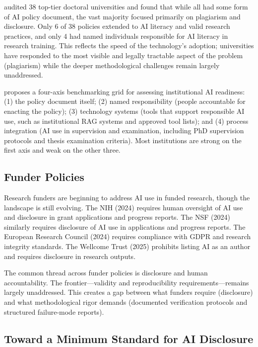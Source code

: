 \documentclass[12pt, a4paper]{article}
\begin{document}
\citet{zyphur2026responsible} audited 38 top-tier doctoral universities and found that while all had some form of AI policy document, the vast majority focused primarily on plagiarism and disclosure. Only 6 of 38 policies extended to AI literacy and valid research practices, and only 4 had named individuals responsible for AI literacy in research training. This reflects the speed of the technology's adoption; universities have responded to the most visible and legally tractable aspect of the problem (plagiarism) while the deeper methodological challenges remain largely unaddressed.

\citet{zyphur2026responsible} proposes a four-axis benchmarking grid for assessing institutional AI readiness: (1) the policy document itself; (2) named responsibility (people accountable for enacting the policy); (3) technology systems (tools that support responsible AI use, such as institutional RAG systems and approved tool lists); and (4) process integration (AI use in supervision and examination, including PhD supervision protocols and thesis examination criteria). Most institutions are strong on the first axis and weak on the other three.

\subsection{Funder Policies}

Research funders are beginning to address AI use in funded research, though the landscape is still evolving. The NIH (2024) requires human oversight of AI use and disclosure in grant applications and progress reports. The NSF (2024) similarly requires disclosure of AI use in applications and progress reports. The European Research Council (2024) requires compliance with GDPR and research integrity standards. The Wellcome Trust (2025) prohibits listing AI as an author and requires disclosure in research outputs.

The common thread across funder policies is disclosure and human accountability. The frontier---validity and reproducibility requirements---remains largely unaddressed. This creates a gap between what funders require (disclosure) and what methodological rigor demands (documented verification protocols and structured failure-mode reports).

\subsection{Toward a Minimum Standard for AI Disclosure}
\end{document}

